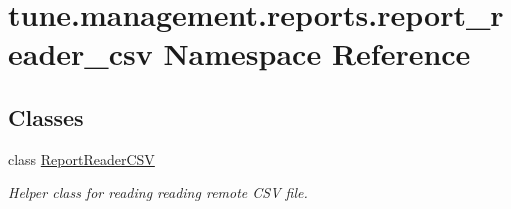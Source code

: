 \hypertarget{namespacetune_1_1management_1_1reports_1_1report__reader__csv}{\section{tune.\-management.\-reports.\-report\-\_\-reader\-\_\-csv Namespace Reference}
\label{namespacetune_1_1management_1_1reports_1_1report__reader__csv}
}
\subsection*{Classes}
\begin{DoxyCompactItemize}
\item 
class \hyperlink{classtune_1_1management_1_1reports_1_1report__reader__csv_1_1ReportReaderCSV}{Report\-Reader\-C\-S\-V}
\begin{DoxyCompactList}\small\item\em Helper class for reading reading remote C\-S\-V file. \end{DoxyCompactList}\end{DoxyCompactItemize}
